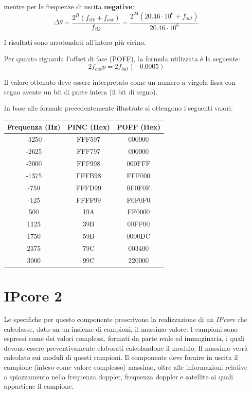 \documentclass[12pt,a4paper,twoside,openany]{book}
\begin{document}
mentre per le frequenze di uscita \textbf{negative}:
$$
	\Delta \theta = \frac{2^B (f_{clk} + f_{out})}{f_{clk}} = \frac{2^{24} (20.46 \cdot 10^6 + f_{out})}{20.46 \cdot 10^6}
$$

I risultati sono arrotondati all'intero più vicino.

Per quanto riguarda l'offset di fase (POFF), la formula utilizzata è la seguente:
$$
	2 f_{out} p = 2 f_{out} (-0.0005)
$$

Il valore ottenuto deve essere interpretato come un numero a virgola fissa con segno avente un bit di parte intera (il bit di segno).

In base alle formule precedentemente illustrate si ottengono i seguenti valori:\\

\begin{center}
\begin{tabular}{|c|c|c|}
\hline
\textbf{Frequenza} (Hz) & \textbf{PINC} (Hex) & \textbf{POFF} (Hex)\\ 
\hline
-3250								& FFF597					   & 000000						\\
\hline
-2625								& FFF797					   & 000000						\\
\hline
-2000								& FFF998					   & 000FFF						\\
\hline
-1375								& FFFB98					   & FFF000						\\
\hline
-750  								& FFFD99					   & 0F0F0F						\\
\hline
-125									& FFFF99					   & F0F0F0						\\
\hline
500									& 19A						   & FF0000						\\
\hline
1125								& 39B						   & 00FF00						\\
\hline
1750								& 59B						   & 0000DC						\\
\hline
2375								& 79C						   & 003400						\\
\hline
3000								& 99C						   & 220000						\\
\hline
\end{tabular}
\end{center}
\clearpage

\chapter{IPcore 2}
Le specifiche per questo componente prescrivono la realizzazione di un \textit{IPcore} che calcolasse, dato un un insieme di campioni, il massimo valore. I campioni sono espressi come dei valori complessi, formati da parte reale ed immaginaria, i quali devono essere preventivamente elaborati calcolandone il modulo. Il massimo verrà calcolato sui moduli di questi campioni. Il componente deve fornire in uscita il campione (inteso come valore complesso) massimo, oltre alle informazioni relative a spiazzamento nella frequenza doppler, frequenza doppler e satellite ai quali appartiene il campione.
\end{document}
